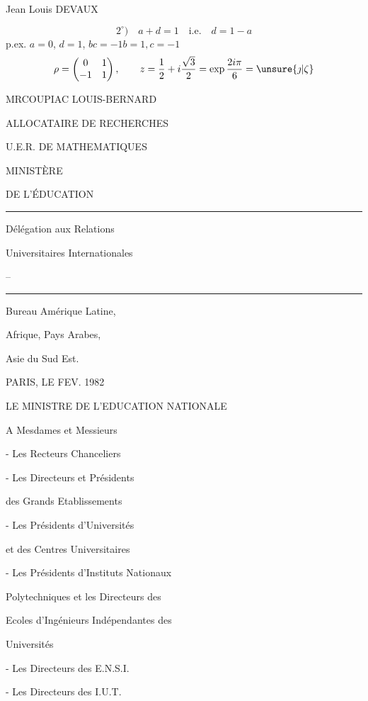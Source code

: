 Jean Louis DEVAUX

\[
2^\circ)\quad a+d=1\quad\text{i.e.}\quad d=1-a
\]
p.ex. $a=0$, $d=1$, $bc=-1$\qquad$b=1,c=-1$
\[
\rho=\begin{pmatrix}0&1\\-1&1\end{pmatrix},\qquad
z=\frac12+i\frac{\sqrt3}{2}=\exp\frac{2i\pi}{6}=\unsure{\jmath|\zeta}
\]

MR\quad COUPIAC LOUIS-BERNARD

ALLOCATAIRE DE RECHERCHES


U.E.R. DE MATHEMATIQUES

MINISTÈRE\par DE L'ÉDUCATION\par\rule{9mm}{.4pt}

Délégation aux Relations\par Universitaires Internationales\par --\par\rule{10mm}{.4pt}

Bureau Amérique Latine,\par Afrique, Pays Arabes,\par Asie du Sud Est.

PARIS, LE FEV. 1982

LE MINISTRE DE L'EDUCATION NATIONALE

A Mesdames et Messieurs

- Les Recteurs Chanceliers\par
- Les Directeurs et Présidents\par des Grands Etablissements\par
- Les Présidents d'Universités\par et des Centres Universitaires\par
- Les Présidents d'Instituts Nationaux\par Polytechniques et les Directeurs des\par Ecoles d'Ingénieurs Indépendantes des\par Universités\par
- Les Directeurs des E.N.S.I.\par
- Les Directeurs des I.U.T.

